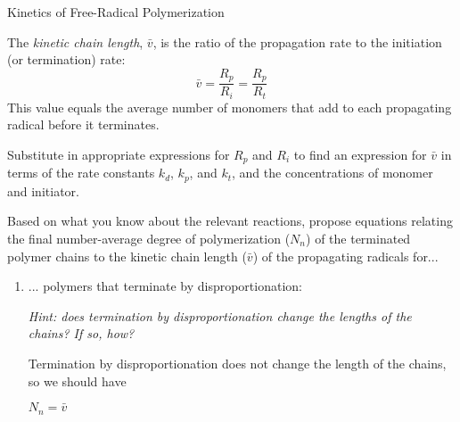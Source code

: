 \begin{activity}{Kinetics of Free-Radical Polymerization}
\begin{ctqs}
\begin{enumerate}
		\end{enumerate}
	
\end{ctqs}

\begin{infobox}\label{\labelbase:infobox:kineticchainlength}
	The \emph{kinetic chain length}, $\bar v$, is the ratio of the propagation rate to the initiation (or termination) rate:
	\begin{equation*}
		\bar v = \frac{R_p}{R_i} = \frac{R_p}{R_t}
	\end{equation*}
	This value equals the average number of monomers that add to each propagating radical before it terminates.
\end{infobox}

\begin{ctqs}

	\question Substitute in appropriate expressions for $R_p$ and $R_i$ to find an expression for $\bar v$ in terms of the rate constants $k_d$, $k_p$, and $k_t$, and the concentrations of monomer and initiator.
	
		\begin{solution}[2.5in]\end{solution}
		
	\question Based on what you know about the relevant reactions, propose equations relating the final number-average degree of polymerization ($N_n$) of the terminated polymer chains to the kinetic chain length ($\bar v$) of the propagating radicals for...
		
		\begin{enumerate}
		
			\item ... polymers that terminate by disproportionation:
			
				\emph{Hint: does termination by disproportionation change the lengths of the chains?  If so, how?}
				
				\begin{solution}[0.75in]
					Termination by disproportionation does not change the length of the chains, so we should have 
					
					$N_n = \bar v$
				\end{solution}
			

\end{enumerate}
\end{ctqs}
\end{activity}
